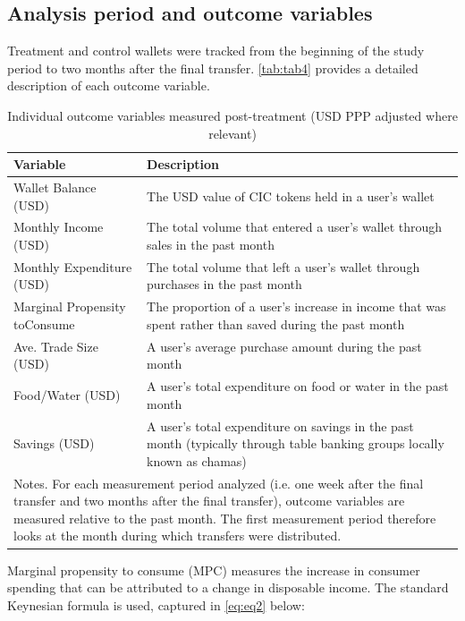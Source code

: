\documentclass[12pt]{article}
\begin{document}
\subsection{Analysis period and outcome variables}
Treatment and control wallets were tracked from the beginning of the study period to two months after the final transfer. \autoref{tab:tab4} provides a detailed description of each outcome variable.

\begin{table}[h]
    \centering
    \caption{Individual outcome variables measured post-treatment (USD PPP adjusted where relevant)}
    \label{tab:tab4}
    \begin{tabular}{p{2.1in}p{4in}} \hline
    Variable & Description \\ \hline
    Wallet Balance (USD) & The USD value of CIC tokens held in a user's wallet \\
    Monthly Income (USD) & The total volume that entered a user's wallet through sales in the past month \\
    Monthly Expenditure (USD) & The total volume that left a user's wallet through purchases in the past month \\
    Marginal Propensity to\newline Consume & The proportion of a user's increase in income that was spent rather than saved during the past month \\
    Ave. Trade Size (USD) & A user's average purchase amount during the past month \\
    Food/Water (USD) & A user's total expenditure on food or water in the past month \\
    Savings (USD) & A user's total expenditure on savings in the past month (typically through table banking groups locally known as chamas) \\ \hline
    \multicolumn{2}{p{6.2in}}{Notes. For each measurement period analyzed (i.e. one week after the final transfer and two months after the final transfer), outcome variables are measured relative to the past month. The first measurement period therefore looks at the month during which transfers were distributed.}
    \end{tabular}
\end{table}

Marginal propensity to consume (MPC) measures the increase in consumer spending that can be attributed to a change in disposable income. The standard Keynesian formula is used, captured in \autoref{eq:eq2} below:
\end{document}
